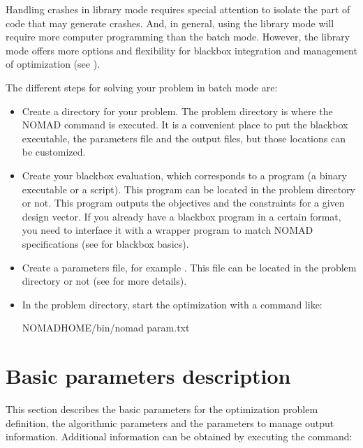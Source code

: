\documentclass[letterpaper,10pt,english]{sphinxmanual}
\begin{document}
\sphinxAtStartPar
Handling crashes in library mode requires special attention to isolate the part of code that may generate crashes. And, in general, using the library mode will require more computer programming than the batch mode. However, the library mode offers more options and flexibility for blackbox integration and management of optimization (see {\hyperref[\detokenize{LibraryMode:library-mode}]{}}).

\sphinxAtStartPar
The different steps for solving your problem in batch mode are:
\begin{itemize}
\item {} 
\sphinxAtStartPar
Create a directory for your problem. The problem directory is where the NOMAD command is executed. It is a convenient place to put the blackbox executable, the parameters file and the output files, but those locations can be customized.

\item {} 
\sphinxAtStartPar
Create your blackbox evaluation, which corresponds  to a program (a binary executable or a script). This program can be located in the problem directory or not.  This program outputs the objectives and the constraints for a given design vector. If you already have a blackbox program in a certain format, you need to interface it with a wrapper program to match  NOMAD specifications (see {\hyperref[\detokenize{GettingStarted:getting-started}]{}} for blackbox basics).

\item {} 
\sphinxAtStartPar
Create a parameters file, for example . This file can be located in the problem directory or not (see {\hyperref[\detokenize{HowToUseNomad:basic-parameters-description}]{}} for more details).

\item {} 
\sphinxAtStartPar
In the problem directory, start the optimization with a command like:

\begin{sphinxVerbatim}[commandchars=\\\{\}]
\PYGZdl{}NOMAD\PYGZus{}HOME/bin/nomad param.txt
\end{sphinxVerbatim}

\end{itemize}


\section{Basic parameters description}
\label{\detokenize{HowToUseNomad:basic-parameters-description}}\label{\detokenize{HowToUseNomad:id3}}
\sphinxAtStartPar
This section describes the basic parameters for the optimization problem definition, the algorithmic parameters and the parameters to manage output information. Additional information can be obtained by executing the command:
\end{document}
